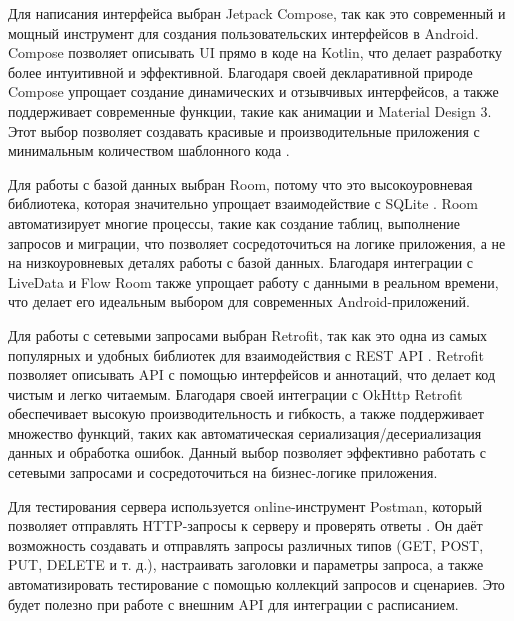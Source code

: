 Для написания интерфейса выбран Jetpack Compose, так как это современный и мощный инструмент для создания пользовательских интерфейсов в Android. Compose позволяет описывать UI прямо в коде на Kotlin, что делает разработку более интуитивной и эффективной. Благодаря своей декларативной природе Compose упрощает создание динамических и отзывчивых интерфейсов, а также поддерживает современные функции, такие как анимации и Material Design 3. Этот выбор позволяет создавать красивые и производительные приложения с минимальным количеством шаблонного кода \cite{refh}.

Для работы с базой данных выбран Room, потому что это высокоуровневая библиотека, которая значительно упрощает взаимодействие с SQLite \cite{reff}. Room автоматизирует многие процессы, такие как создание таблиц, выполнение запросов и миграции, что позволяет сосредоточиться на логике приложения, а не на низкоуровневых деталях работы с базой данных. Благодаря интеграции с LiveData и Flow Room также упрощает работу с данными в реальном времени, что делает его идеальным выбором для современных Android-приложений.

Для работы с сетевыми запросами выбран Retrofit, так как это одна из самых популярных и удобных библиотек для взаимодействия с REST API \cite{refg}. Retrofit позволяет описывать API с помощью интерфейсов и аннотаций, что делает код чистым и легко читаемым. Благодаря своей интеграции с OkHttp Retrofit обеспечивает высокую производительность и гибкость, а также поддерживает множество функций, таких как автоматическая сериализация/десериализация данных и обработка ошибок. Данный выбор позволяет эффективно работать с сетевыми запросами и сосредоточиться на бизнес-логике приложения.

Для тестирования сервера используется online-инструмент Postman, который позволяет отправлять HTTP-запросы к серверу и проверять ответы \cite{refh}. Он даёт возможность создавать и отправлять запросы различных типов (GET, POST, PUT, DELETE и т. д.), настраивать заголовки и параметры запроса, а также автоматизировать тестирование с помощью коллекций запросов и сценариев. Это будет полезно при работе с внешним API для интеграции с расписанием.

